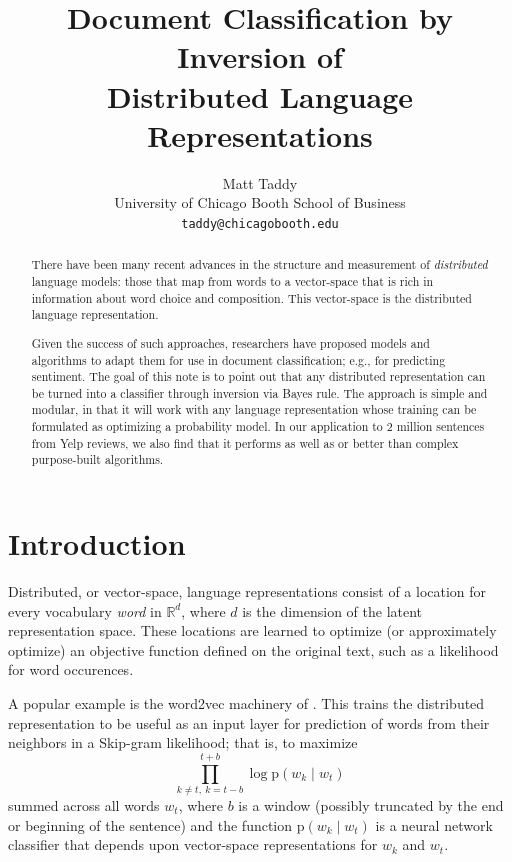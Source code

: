 \documentclass[11pt]{article}
\title{Document Classification by Inversion of \\Distributed Language Representations}
\author{Matt Taddy \\
  University of Chicago Booth School of Business \\
  {\tt taddy@chicagobooth.edu} \\}
\date{}
\begin{document}
\maketitle
\begin{abstract}
There have been many recent advances in the structure and measurement of {\it distributed} language models: those that map from words to a vector-space that is rich in information about word choice and composition.  This vector-space is the distributed language representation.    

Given the success of such approaches,  researchers have proposed
models and algorithms to adapt them for use in document classification; e.g., for predicting sentiment.  The goal of this note is to point out that any distributed  representation can be turned into a classifier through inversion via Bayes rule.  
The approach is simple and modular, in that it will work with any language representation whose training can be formulated as optimizing a probability model. In our application to 2 million sentences from Yelp reviews, we also find that it performs as well as or better than  complex purpose-built algorithms. \end{abstract}

\section{Introduction}

Distributed, or vector-space, language representations consist of a location
for every vocabulary {\it word} in $\mathds{R}^d$, where $d$ is the dimension
of the latent representation space.  These locations are learned to optimize (or approximately optimize) an objective function defined on the original text, such as
a likelihood for word occurences.

A popular example is the word2vec machinery of .  This 
trains the distributed representation to be useful as an input layer for prediction of
words from their neighbors in a Skip-gram likelihood; that is, to maximize 
\begin{equation}
\prod_{k\neq t,~k=t-b}^{t+b} \log\mathrm{p}(w_k\mid w_t)
\end{equation}
summed across all words $w_t$, where $b$ is a window (possibly truncated by the end or beginning of the sentence) and the function $\mathrm{p}(w_k\mid w_t)$ is a neural network classifier that depends upon vector-space representations for $w_k$ and $w_t$.
\end{document}
